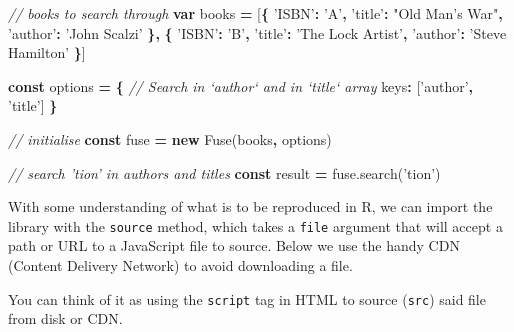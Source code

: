 \documentclass[10pt,]{krantz}
\makeatletter
\newenvironment{Shaded}{\begin{snugshade}}{\end{snugshade}}
\newcommand{\AttributeTok}[1]{\textcolor[rgb]{0.61,0.61,0.61}{#1}}
\newcommand{\CommentTok}[1]{\textcolor[rgb]{0.37,0.37,0.37}{\textit{#1}}}
\newcommand{\DataTypeTok}[1]{\textcolor[rgb]{0.27,0.27,0.27}{#1}}
\newcommand{\KeywordTok}[1]{\textcolor[rgb]{0.27,0.27,0.27}{\textbf{#1}}}
\newcommand{\NormalTok}[1]{#1}
\newcommand{\OperatorTok}[1]{\textcolor[rgb]{0.43,0.43,0.43}{\textbf{#1}}}
\newcommand{\StringTok}[1]{\textcolor[rgb]{0.5,0.5,0.5}{#1}}
\newcommand{\VariableTok}[1]{\textcolor[rgb]{0,0,0}{#1}}
\newenvironment{kframe}{%
\medskip{}
\setlength{\fboxsep}{.8em}
 \def\at@end@of@kframe{}%
 \ifinner\ifhmode%
  \def\at@end@of@kframe{\end{minipage}}%
  \begin{minipage}{\columnwidth}%
 \fi\fi%
 \def\FrameCommand##1{\hskip\@totalleftmargin \hskip-\fboxsep
 \colorbox{shadecolor}{##1}\hskip-\fboxsep
     \hskip-\linewidth \hskip-\@totalleftmargin \hskip\columnwidth}%
 \MakeFramed {\advance\hsize-\width
   \@totalleftmargin\z@ \linewidth\hsize
   \@setminipage}}%
 {\par\unskip\endMakeFramed%
 \at@end@of@kframe}
\renewenvironment{Shaded}{\begin{kframe}}{\end{kframe}}
\makeatother
\begin{document}
\begin{Shaded}
\begin{Highlighting}[]
\CommentTok{// books to search through}
\KeywordTok{var}\NormalTok{ books }\OperatorTok{=}\NormalTok{ [}\OperatorTok{\{}
  \StringTok{'ISBN'}\OperatorTok{:} \StringTok{'A'}\OperatorTok{,}
  \StringTok{'title'}\OperatorTok{:} \StringTok{"Old Man's War"}\OperatorTok{,}
  \StringTok{'author'}\OperatorTok{:} \StringTok{'John Scalzi'}
\OperatorTok{\},} \OperatorTok{\{}
  \StringTok{'ISBN'}\OperatorTok{:} \StringTok{'B'}\OperatorTok{,}
  \StringTok{'title'}\OperatorTok{:} \StringTok{'The Lock Artist'}\OperatorTok{,}
  \StringTok{'author'}\OperatorTok{:} \StringTok{'Steve Hamilton'}
\OperatorTok{\}}\NormalTok{]}

\KeywordTok{const}\NormalTok{ options }\OperatorTok{=} \OperatorTok{\{}
  \CommentTok{// Search in `author` and in `title` array}
  \DataTypeTok{keys}\OperatorTok{:}\NormalTok{ [}\StringTok{'author'}\OperatorTok{,} \StringTok{'title'}\NormalTok{]}
\OperatorTok{\}}

\CommentTok{// initialise}
\KeywordTok{const}\NormalTok{ fuse }\OperatorTok{=} \KeywordTok{new} \AttributeTok{Fuse}\NormalTok{(books}\OperatorTok{,}\NormalTok{ options)}

\CommentTok{// search 'tion' in authors and titles}
\KeywordTok{const}\NormalTok{ result }\OperatorTok{=} \VariableTok{fuse}\NormalTok{.}\AttributeTok{search}\NormalTok{(}\StringTok{'tion'}\NormalTok{)}
\end{Highlighting}
\end{Shaded}

With some understanding of what is to be reproduced in R, we can import the library with the \texttt{source} method, which takes a \texttt{file} argument that will accept a path or URL to a JavaScript file to source. Below we use the handy CDN (Content Delivery Network) to avoid downloading a file.

\begin{Shaded}
\end{Shaded}

You can think of it as using the \texttt{script} tag in HTML to source (\texttt{src}) said file from disk or CDN.
\end{document}
